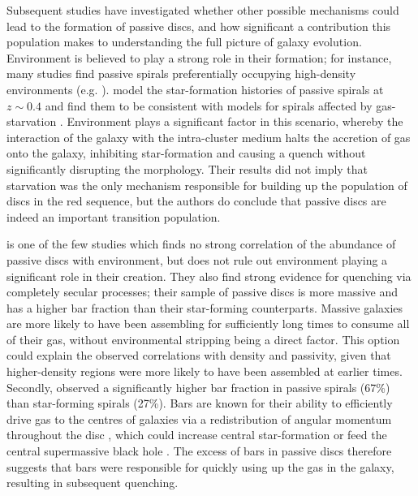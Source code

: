 \documentclass[useAMS,usenatbib]{mn2e}
\begin{document}
Subsequent studies have investigated whether other possible mechanisms could lead to the formation of passive discs, and how significant a contribution this population makes to understanding the full picture of galaxy evolution. Environment is believed to play a strong role in their formation; for instance, many studies find passive spirals preferentially occupying high-density environments (e.g. \citet{Dressler1999, Poggianti1999, Goto2003, Deng2009, Hughes2009, Fraser-McKelvie2017}). \citet{Moran2006} model the star-formation histories of passive spirals at $z\sim0.4$ and find them to be consistent with models for spirals affected by gas-starvation \citep{Larson1980, Quilis2000, Bekki2002}. Environment plays a significant factor in this scenario, whereby the interaction of the galaxy with the intra-cluster medium halts the accretion of gas onto the galaxy, inhibiting star-formation and causing a quench without significantly disrupting the morphology. Their results did not imply that starvation was the only mechanism responsible for building up the population of discs in the red sequence, but the authors do conclude that passive discs are indeed an important transition population.

\citet{Masters2010} is one of the few studies which finds no strong correlation of the abundance of passive discs with environment, but does not rule out environment playing a significant role in their creation. They also find strong evidence for quenching via completely secular processes; their sample of passive discs is more massive and has a higher bar fraction than their star-forming counterparts. Massive galaxies are more likely to have been assembling for sufficiently long times to consume all of their gas, without environmental stripping being a direct factor. This option could explain the observed correlations with density and passivity, given that higher-density regions were more likely to have been assembled at earlier times. Secondly, \citet{Masters2010} observed a significantly higher bar fraction in passive spirals (67\%) than star-forming spirals (27\%). Bars are known for their ability to efficiently drive gas to the centres of galaxies via a redistribution of angular momentum throughout the disc \citep{Sellwood1993,Shlosman1989,Ann2005}, which could increase central star-formation \citep{Hawarden1986,Ho1997} or feed the central supermassive black hole \citep{Athanassoula1992,Friedli1993,Galloway2015}. The excess of bars in passive discs therefore suggests that bars were responsible for quickly using up the gas in the galaxy, resulting in subsequent quenching. 
\end{document}
